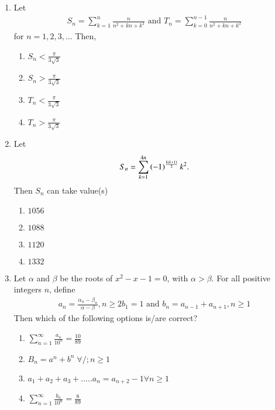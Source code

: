 \documentclass[journal]{IEEEtran}
\theoremstyle{remark}
\begin{document}
\begin{enumerate}
\item Let 
\begin{align*}
S_n=\sum_{k=1}^{n}\frac{n}{n^2+kn+k^2} \text{ and }   T_n=\sum_{k=0}^{n-1}\frac{n}{n^2+kn+k^2}
\end{align*}
for $n=1,2,3,\dots$ Then,\hfill{}
\begin{multicols}{4}
\begin{enumerate}
\item $S_n<\frac{\pi}{3\sqrt{3}}$
\item $S_n>\frac{\pi}{3\sqrt{3}}$
\item $T_n<\frac{\pi}{3\sqrt{3}}$
\item $T_n>\frac{\pi}{3\sqrt{3}}$
\end{enumerate}
\end{multicols}

\item Let \begin{align*} S_n=\sum_{k=1}^{4n}\left(-1\right)^\frac{k\left(k+1\right)}{2}k^2.\end{align*}  Then $S_n$ can take value(s)  \hfill{}
\begin{multicols}{4}
\begin{enumerate}
\item $1056$
\item $1088$
\item $1120$
\item $1332$
\end{enumerate}
\end{multicols}

\item Let $\alpha$ and $\beta$ be the roots of $x^2-x-1=0$, with $\alpha>\beta$. For all positive integers $n$, define
\begin{align*}
a_n=\frac{\alpha_n-\beta_n}{\alpha-\beta},n\geq2
b_1=1  \text{ and }  b_n=a_{n-1}+a_{n+1},n\geq1
\end{align*}
Then which of the following options is/are correct?
\hfill{}
\begin{multicols}{2}
\begin{enumerate}
\item $\sum_{n=1}^{\infty}\frac{a_n}{10^n}=\frac{10}{89}$
\item $B_n=a^n+b^n \; \forall /; n\geq1$
\item $a_1+a_2+a_3+.....a_n=a_{n+2}-1 \forall n\geq1$
\item $\sum_{n=1}^{\infty}\frac{b_n}{10^n}=\frac{8}{89}$
\end{enumerate}
\end{multicols}
\end{enumerate}
\end{document}

